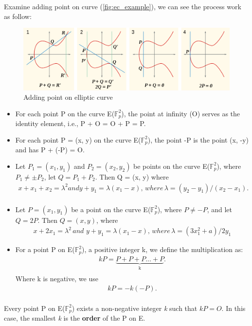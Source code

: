 Examine adding point on curve (\autoref{fig:ec_example}), we can see the process work as follow:
\begin{figure}[ht!]
  \centering
  \includegraphics[width=1\textwidth]{images/adding_point.png}
  \caption[Adding point on elliptic curve]{Adding point on elliptic curve}
  \label{fig:add_point}
\end{figure}
\begin{itemize}
  \item For each point P on the curve E($\mathbb{F}_{p}^2$), the point at infinity (O) serves as the identity element, i.e., P + O = O + P = P.
  \item For each point P = (x, y) on the curve E($\mathbb{F}_{p}^2$), the point -P is the point (x, -y) and has P + (-P) = O.
  \item Let $P_1 =(x_1, y_1)$ and $P_2 = (x_2, y_2)$ be points on the curve E($\mathbb{F}_{p}^2$), where $P_1 \neq \pm P_2$, let $Q = P_1 + P_2$. Then Q = (x, y) where  \medskip
        \begin{align*}
          x + x_1 + x_2 = \lambda^2 and y + y_1 = \lambda(x_1 - x), \,	where \, \lambda = (y_2 - y_1)/(x_2 - x_1). \\
        \end{align*}
  \item Let $P = (x_1, y_1)$ be a point on the curve E($\mathbb{F}_{p}^2$), where $P \neq -P$, and let $Q = 2P$. Then $Q = (x, y)$, where \medskip
        \begin{align*}
          x + 2x_1 = \lambda^2 \, and \, \, y + y_1 = \lambda(x_1 - x), \, where \, \lambda = (3x_1^2 + a)/2y_1
        \end{align*}
  \item For a point P on E($\mathbb{F}_{p}^2$), a positive integer k, we define the multiplication as: \medskip
        \begin{align*}
          kP = \underbrace{P + P + P ... + P}_\text{k}. \\
        \end{align*}
        Where k is negative, we use
        \begin{align*}
          kP = -k(-P). \\
        \end{align*}
\end{itemize}
Every point P on E($\mathbb{F}_{p}^2$) exists a non-negative integer \emph{k} such that $kP = O$. In this case, the smallest \emph{k} is the {\bf order} of the P on E.

